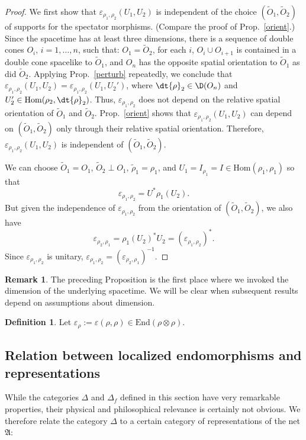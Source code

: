 \documentclass[11pt]{article}
\newcommand{\alg}[1]{\mathfrak{#1}}
\theoremstyle{definition}
\theoremstyle{definition}
\newtheorem{defn}[thm]{Definition}
\newtheorem{note}[thm]{Remark}
\theoremstyle{remark}
\newcommand{\ve}{\varepsilon}
\def\wt#1{{\tilde #1}}
\newcommand{\Hom}{\mathrm{Hom}}
\begin{document}
\begin{proof} We first show that $\ve _{\rho _1,\rho _2}(U_1,U_2)$ is independent of
  the choice $(\wt O_1,\wt O_2)$ of supports for the spectator morphisms.  (Compare
  the proof of Prop.\ \ref{orient}.)  Since the spacetime has at least three
  dimensions, there is a sequence of double cones $O_{i}$, $i=1,\dots ,n$, such that:
  $O_1=\wt O_2$, for each $i$, $O_{i}\cup O_{i+1}$ is contained in a double cone
  spacelike to $\wt O_1$, and $O_{n}$ has the opposite spatial orientation to $\wt
  O_1$ as did $\wt O_2$.  Applying Prop.\ \ref{perturb} repeatedly, we conclude that
  $\ve _{\rho _1,\rho _2}(U_1,U_2)=\ve _{\rho _1,\rho _2}(U_1,U_2')$, where
  $\dt{\rho}_2\in \D (O_n)$ and $U_2'\in \Hom (\rho _2,\dt{\rho}_2)$.  Thus, $\ve
  _{\rho _1,\rho _2}$ does not depend on the relative spatial orientation of $\wt
  O_1$ and $\wt O_2$.  Prop.\ \ref{orient} shows that $\ve _{\rho _1,\rho
    _2}(U_1,U_2)$ can depend on $(\wt O_1,\wt O_2)$ only through their relative
  spatial orientation.  Therefore, $\ve _{\rho _1,\rho _2}(U_1,U_2)$ is independent
  of $(\wt O_1,\wt O_2)$.

  We can choose $\wt O_1=O_1$, $\wt O_2\perp O_1$, $\wt \rho _1=\rho _1$, and
  $U_1=I_{\rho _1}=I\in \Hom (\rho _1,\rho _1)$ so that
$$ \ve _{\rho _1,\rho _2}=U^*\rho _1(U_2). $$
But given the independence of $\ve _{\rho _1,\rho _2}$ from the orientation of $(\wt
O_1,\wt O_2)$, we also have
$$ \ve _{\rho _2,\rho _1}=\rho _1(U_2)^*U_2 =(\ve _{\rho _1,\rho _2})^* .$$  
Since $\ve _{\rho _1,\rho _2}$ is unitary, $\ve _{\rho _1,\rho _2}=(\ve _{\rho
  _2,\rho _1})^{-1}$.  \end{proof}

\begin{note} The preceding Proposition is the first place where we invoked the
  dimension of the underlying spacetime.  We will be clear when subsequent results
  depend on assumptions about dimension.  \end{note}

\begin{defn} Let $\ve _\rho := \ve (\rho ,\rho )\in \mathrm{End}(\rho \otimes \rho)$.
\end{defn}


\subsection{Relation between localized endomorphisms
  and representations} \label{ss-dhr} While the
categories $\Delta$ and $\Delta_f$ defined in this
section have very remarkable properties, their physical
and philosophical relevance is certainly not
obvious. We therefore relate the category $\Delta$ to a
certain category of representations of the net
$\alg{\alg{A}}$:
\end{document}
